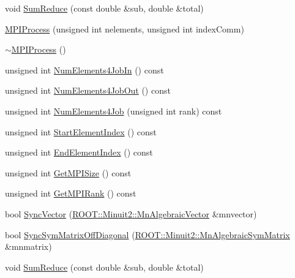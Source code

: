 \begin{DoxyCompactItemize}
\item 
void \mbox{\hyperlink{classROOT_1_1Minuit2_1_1MPIProcess_ac28c4a6a09a1518bbfa5ed09b676bd7c}{Sum\+Reduce}} (const double \&sub, double \&total)
\item 
\mbox{\hyperlink{classROOT_1_1Minuit2_1_1MPIProcess_a43d72185b19c2e99f914ff408fd2755b}{M\+P\+I\+Process}} (unsigned int nelements, unsigned int index\+Comm)
\item 
\mbox{\hyperlink{classROOT_1_1Minuit2_1_1MPIProcess_ac2be6e4b9a721d7f1bf9512580bc113b}{$\sim$\+M\+P\+I\+Process}} ()
\item 
unsigned int \mbox{\hyperlink{classROOT_1_1Minuit2_1_1MPIProcess_ada3f8f6f1b28844db6cb6bd717521ffd}{Num\+Elements4\+Job\+In}} () const
\item 
unsigned int \mbox{\hyperlink{classROOT_1_1Minuit2_1_1MPIProcess_a8ab54fbeb2dd760265e0121573361c3f}{Num\+Elements4\+Job\+Out}} () const
\item 
unsigned int \mbox{\hyperlink{classROOT_1_1Minuit2_1_1MPIProcess_a9d9453545f311f9f9f995800ed518258}{Num\+Elements4\+Job}} (unsigned int rank) const
\item 
unsigned int \mbox{\hyperlink{classROOT_1_1Minuit2_1_1MPIProcess_a9e6b2dc6f57cc91bb11637b50ba15957}{Start\+Element\+Index}} () const
\item 
unsigned int \mbox{\hyperlink{classROOT_1_1Minuit2_1_1MPIProcess_af4445148831dec4961d5f8aa99aeb2c1}{End\+Element\+Index}} () const
\item 
unsigned int \mbox{\hyperlink{classROOT_1_1Minuit2_1_1MPIProcess_a9bd9f26ca9de3967741e014fcab5bb59}{Get\+M\+P\+I\+Size}} () const
\item 
unsigned int \mbox{\hyperlink{classROOT_1_1Minuit2_1_1MPIProcess_a86c50a55e3ae2651b74fa18443a13dd3}{Get\+M\+P\+I\+Rank}} () const
\item 
bool \mbox{\hyperlink{classROOT_1_1Minuit2_1_1MPIProcess_a179f3ea817399a73cbce05d1778ec128}{Sync\+Vector}} (\mbox{\hyperlink{namespaceROOT_1_1Minuit2_a62ed97730a1ca8d3fbaec64a19aa11c9}{R\+O\+O\+T\+::\+Minuit2\+::\+Mn\+Algebraic\+Vector}} \&mnvector)
\item 
bool \mbox{\hyperlink{classROOT_1_1Minuit2_1_1MPIProcess_ac00f83396ec6b7985dad640981a07657}{Sync\+Sym\+Matrix\+Off\+Diagonal}} (\mbox{\hyperlink{namespaceROOT_1_1Minuit2_a9e74ad97f5537a2e80e52b04d98ecc6e}{R\+O\+O\+T\+::\+Minuit2\+::\+Mn\+Algebraic\+Sym\+Matrix}} \&mnmatrix)
\item 
void \mbox{\hyperlink{classROOT_1_1Minuit2_1_1MPIProcess_ac28c4a6a09a1518bbfa5ed09b676bd7c}{Sum\+Reduce}} (const double \&sub, double \&total)
\end{DoxyCompactItemize}
